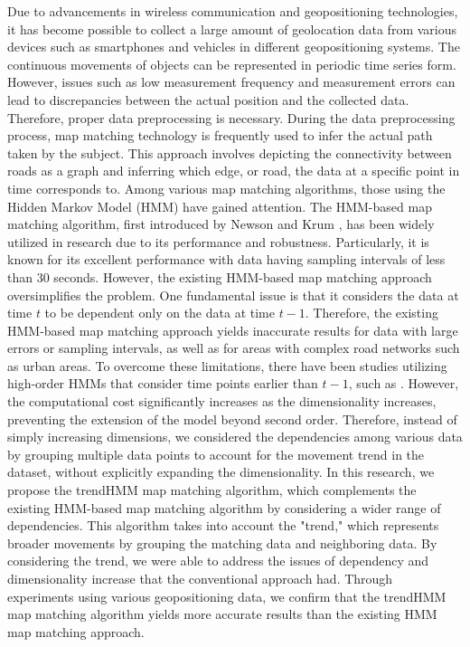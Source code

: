 \documentclass[preprint,12pt]{elsarticle}
\begin{document}
Due to advancements in wireless communication and geopositioning technologies, it has become possible to collect a large amount of geolocation data from various devices such as smartphones and vehicles in different geopositioning systems. The continuous movements of objects can be represented in periodic time series form.
However, issues such as low measurement frequency and measurement errors can lead to discrepancies between the actual position and the collected data. Therefore, proper data preprocessing is necessary. During the data preprocessing process, map matching technology is frequently used to infer the actual path taken by the subject. 
This approach involves depicting the connectivity between roads as a graph and inferring which edge, or road, the data at a specific point in time corresponds to. Among various map matching algorithms, those using the Hidden Markov Model (HMM) have gained attention. 
The HMM-based map matching algorithm, first introduced by Newson and Krum \cite{newson2009hidden}, has been widely utilized in research due to its performance and robustness. Particularly, it is known for its excellent performance with data having sampling intervals of less than 30 seconds. However, the existing HMM-based map matching approach oversimplifies the problem. One fundamental issue is that it considers the data at time $t$ to be dependent only on the data at time $t-1$. Therefore, the existing HMM-based map matching approach yields inaccurate results for data with large errors or sampling intervals, as well as for areas with complex road networks such as urban areas. To overcome these limitations, there have been studies utilizing high-order HMMs that consider time points earlier than $t-1$, such as \cite{secondHMM1, secondHMM2}. However, the computational cost significantly increases as the dimensionality increases, preventing the extension of the model beyond second order. Therefore, instead of simply increasing dimensions, we considered the dependencies among various data by grouping multiple data points to account for the movement trend in the dataset, without explicitly expanding the dimensionality. In this research, we propose the trendHMM map matching algorithm, which complements the existing HMM-based map matching algorithm by considering a wider range of dependencies. This algorithm takes into account the "trend," which represents broader movements by grouping the matching data and neighboring data. By considering the trend, we were able to address the issues of dependency and dimensionality increase that the conventional approach had. Through experiments using various geopositioning data, we confirm that the trendHMM map matching algorithm yields more accurate results than the existing HMM map matching approach. 
\end{document}
